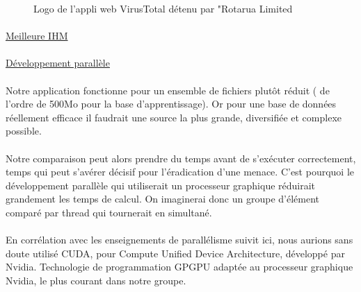 \documentclass[a4paper, 12pt]{book}
\begin{document}
\begin{figure}[!h] 	
    \caption{Logo de l'appli web VirusTotal détenu par "Rotarua Limited}
\end{figure}



\paragraph{}
\underline{Meilleure IHM}
\paragraph{}

\paragraph{}
\underline{Développement parallèle}
\paragraph{}

Notre application fonctionne pour un ensemble de fichiers plutôt réduit ( de l'ordre de 500Mo pour la base d'apprentissage). Or pour une base de données réellement efficace il faudrait une source la plus grande, diversifiée et complexe possible.
\paragraph{}
Notre comparaison peut alors prendre du temps avant de s’exécuter correctement, temps qui peut s’avérer décisif pour l'éradication d'une menace. C'est pourquoi le développement parallèle qui utiliserait un processeur graphique réduirait grandement les temps de calcul. On imaginerai donc un groupe d'élément comparé par thread qui tournerait en simultané.

\paragraph{}
En corrélation avec les enseignements de parallélisme suivit ici, nous aurions sans doute utilisé CUDA, pour Compute Unified Device Architecture, développé par Nvidia. Technologie de programmation GPGPU adaptée au processeur graphique Nvidia, le plus courant dans notre groupe.
\end{document}
